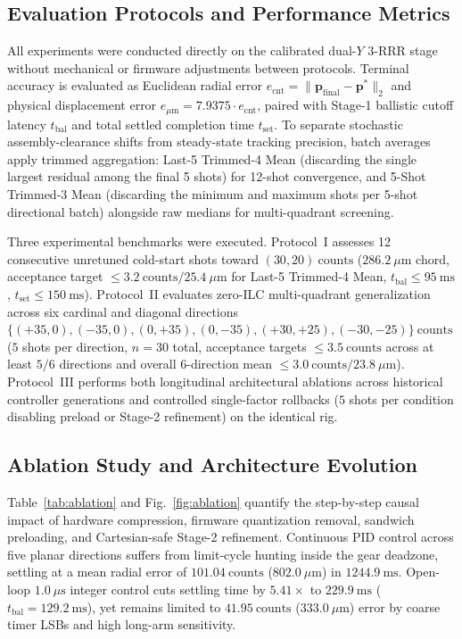 \documentclass[journal]{IEEEtran}
\begin{document}
\subsection{Evaluation Protocols and Performance Metrics}

All experiments were conducted directly on the calibrated dual-$Y$ 3-RRR stage without mechanical or firmware adjustments between protocols. Terminal accuracy is evaluated as Euclidean radial error $e_{\text{cnt}} = \|\mathbf{p}_{\text{final}} - \mathbf{p}^*\|_2$ and physical displacement error $e_{\mu\text{m}} = 7.9375 \cdot e_{\text{cnt}}$, paired with Stage-1 ballistic cutoff latency $t_{\text{bal}}$ and total settled completion time $t_{\text{set}}$. To separate stochastic assembly-clearance shifts from steady-state tracking precision, batch averages apply trimmed aggregation: Last-5 Trimmed-4 Mean (discarding the single largest residual among the final 5 shots) for 12-shot convergence, and 5-Shot Trimmed-3 Mean (discarding the minimum and maximum shots per 5-shot directional batch) alongside raw medians for multi-quadrant screening.

Three experimental benchmarks were executed. Protocol~I assesses 12 consecutive unretuned cold-start shots toward $(30, 20)\ \text{counts}$ ($286.2\ \mu\text{m}$ chord, acceptance target $\le 3.2\ \text{counts} / 25.4\ \mu\text{m}$ for Last-5 Trimmed-4 Mean, $t_{\text{bal}} \le 95\ \text{ms}$, $t_{\text{set}} \le 150\ \text{ms}$). Protocol~II evaluates zero-ILC multi-quadrant generalization across six cardinal and diagonal directions $\{(+35,0), (-35,0), (0,+35), (0,-35), (+30,+25), (-30,-25)\}\ \text{counts}$ ($5$ shots per direction, $n = 30$ total, acceptance targets $\le 3.5\ \text{counts}$ across at least $5/6$ directions and overall 6-direction mean $\le 3.0\ \text{counts} / 23.8\ \mu\text{m}$). Protocol~III performs both longitudinal architectural ablations across historical controller generations and controlled single-factor rollbacks ($5$ shots per condition disabling preload or Stage-2 refinement) on the identical rig.

\subsection{Ablation Study and Architecture Evolution}

Table~\ref{tab:ablation} and Fig.~\ref{fig:ablation} quantify the step-by-step causal impact of hardware compression, firmware quantization removal, sandwich preloading, and Cartesian-safe Stage-2 refinement. Continuous PID control across five planar directions suffers from limit-cycle hunting inside the gear deadzone, settling at a mean radial error of $101.04\ \text{counts}$ ($802.0\ \mu\text{m}$) in $1244.9\ \text{ms}$. Open-loop $1.0\ \mu\text{s}$ integer control cuts settling time by $5.41\times$ to $229.9\ \text{ms}$ ($t_{\text{bal}} = 129.2\ \text{ms}$), yet remains limited to $41.95\ \text{counts}$ ($333.0\ \mu\text{m}$) error by coarse timer LSBs and high long-arm sensitivity.
\end{document}
